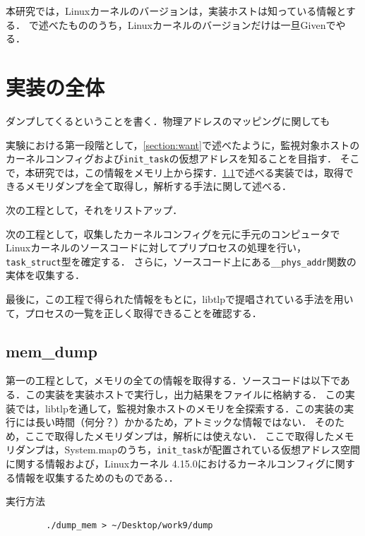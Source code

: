 本研究では，Linuxカーネルのバージョンは，実装ホストは知っている情報とする．
\label{section:want}で述べたもののうち，Linuxカーネルのバージョンだけは一旦Givenでやる．

\section{実装の全体}

ダンプしてくるということを書く．物理アドレスのマッピングに関しても

実験における第一段階として，\ref{section:want}で述べたように，監視対象ホストのカーネルコンフィグおよび\verb|init_task|の仮想アドレスを知ることを目指す．
そこで，本研究では，この情報をメモリ上から探す．\ref{section:mem_dump}で述べる実装では，取得できるメモリダンプを全て取得し，解析する手法に関して述べる．

次の工程として，それをリストアップ．

次の工程として，収集したカーネルコンフィグを元に手元のコンピュータでLinuxカーネルのソースコードに対してプリプロセスの処理を行い，\verb|task_struct|型を確定する．
さらに，ソースコード上にある\verb|__phys_addr|関数の実体を収集する．

最後に，この工程で得られた情報をもとに，libtlpで提唱されている手法を用いて，プロセスの一覧を正しく取得できることを確認する．

\subsection{mem\_dump}
\label{section:mem_dump}

第一の工程として，メモリの全ての情報を取得する．ソースコードは以下である．この実装を実装ホストで実行し，出力結果をファイルに格納する．
この実装では，libtlpを通して，監視対象ホストのメモリを全探索する．この実装の実行には長い時間（何分？）かかるため，アトミックな情報ではない．
そのため，ここで取得したメモリダンプは，解析には使えない．
ここで取得したメモリダンプは，System.mapのうち，\verb|init_task|が配置されている仮想アドレス空間に関する情報および，Linuxカーネル 4.15.0におけるカーネルコンフィグに関する情報を収集するためのものである．．


\begin{itembox}[l]{実行方法}
    \begin{verbatim}
        ./dump_mem > ~/Desktop/work9/dump
    \end{verbatim}
\end{itembox}

